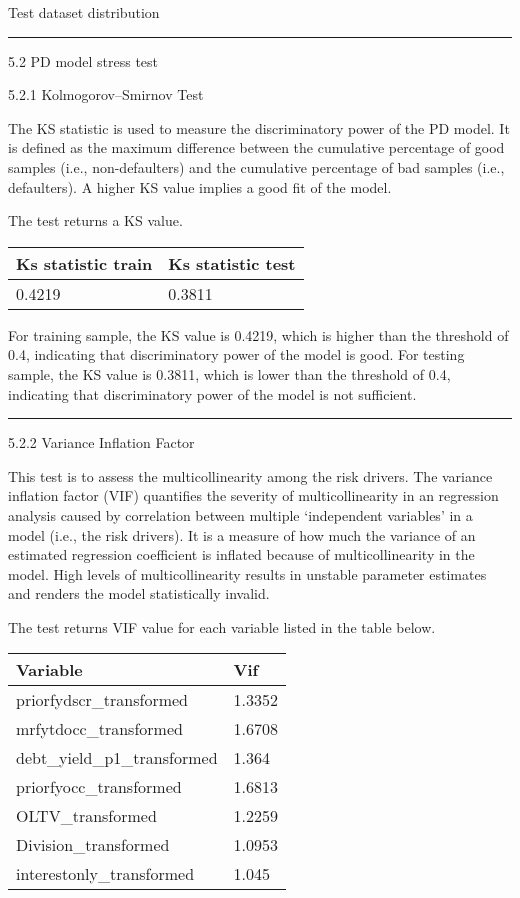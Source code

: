 Test dataset distribution

\begin{center}\rule{0.5\linewidth}{\linethickness}\end{center}

5.2 PD model stress test

5.2.1 Kolmogorov--Smirnov Test

The KS statistic is used to measure the discriminatory power of the PD
model. It is defined as the maximum difference between the cumulative
percentage of good samples (i.e., non-defaulters) and the cumulative
percentage of bad samples (i.e., defaulters). A higher KS value implies
a good fit of the model.

The test returns a KS value.

\begin{longtable}[]{@{}ll@{}}
\toprule
Ks statistic train & Ks statistic test\tabularnewline
\midrule
\endhead
0.4219 & 0.3811\tabularnewline
\bottomrule
\end{longtable}

For training sample, the KS value is 0.4219, which is higher than the
threshold of 0.4, indicating that discriminatory power of the model is
good. For testing sample, the KS value is 0.3811, which is lower than
the threshold of 0.4, indicating that discriminatory power of the model
is not sufficient.

\begin{center}\rule{0.5\linewidth}{\linethickness}\end{center}

5.2.2 Variance Inflation Factor

This test is to assess the multicollinearity among the risk drivers. The
variance inflation factor (VIF) quantifies the severity of
multicollinearity in an regression analysis caused by correlation
between multiple `independent variables' in a model (i.e., the risk
drivers). It is a measure of how much the variance of an estimated
regression coefficient is inflated because of multicollinearity in the
model. High levels of multicollinearity results in unstable parameter
estimates and renders the model statistically invalid.

The test returns VIF value for each variable listed in the table below.

\begin{longtable}[]{@{}ll@{}}
\toprule
Variable & Vif\tabularnewline
\midrule
\endhead
priorfydscr\_transformed & 1.3352\tabularnewline
mrfytdocc\_transformed & 1.6708\tabularnewline
debt\_yield\_p1\_transformed & 1.364\tabularnewline
priorfyocc\_transformed & 1.6813\tabularnewline
OLTV\_transformed & 1.2259\tabularnewline
Division\_transformed & 1.0953\tabularnewline
interestonly\_transformed & 1.045\tabularnewline
\bottomrule
\end{longtable}


